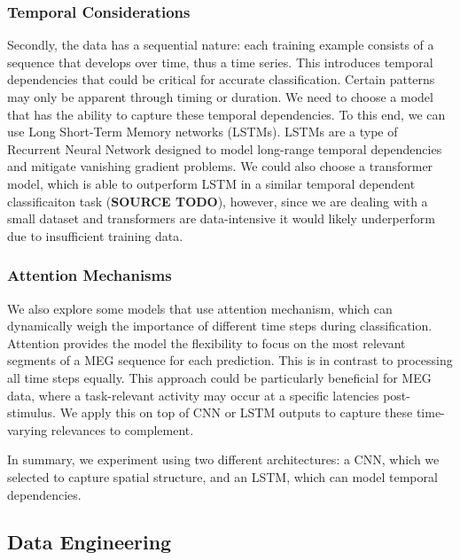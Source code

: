\documentclass[conference]{IEEEtran}
\begin{document}
\subsubsection{Temporal Considerations}
Secondly, the data has a sequential nature: each training example consists of a sequence that develops over time, thus a time series. This introduces temporal dependencies that could be critical for accurate classification. Certain patterns may only be apparent through timing or duration. We need to choose a model that has the ability to capture these temporal dependencies. To this end, we can use Long Short-Term Memory networks (LSTMs). LSTMs are a type of Recurrent Neural Network designed to model long-range temporal dependencies and mitigate vanishing gradient problems. We could also choose a transformer model, which is able to outperform LSTM in a similar temporal dependent classificaiton task (\textbf{SOURCE TODO}), however, since we are dealing with a small dataset and transformers are data-intensive it would likely underperform due to insufficient training data. 

\subsubsection{Attention Mechanisms}
We also explore some models that use attention mechanism, which can dynamically weigh the importance of different time steps during classification. Attention provides the model the flexibility to focus on the most relevant segments of a MEG sequence for each prediction. This is in contrast to processing all time steps equally. This approach could be particularly beneficial for MEG data, where a task-relevant activity may occur at a specific latencies post-stimulus. We apply this on top of CNN or LSTM outputs to capture these time-varying relevances to complement.

In summary, we experiment using two different architectures: a CNN, which we selected to capture spatial structure, and an LSTM, which can model temporal dependencies. 

\subsection{Data Engineering}
\end{document}

